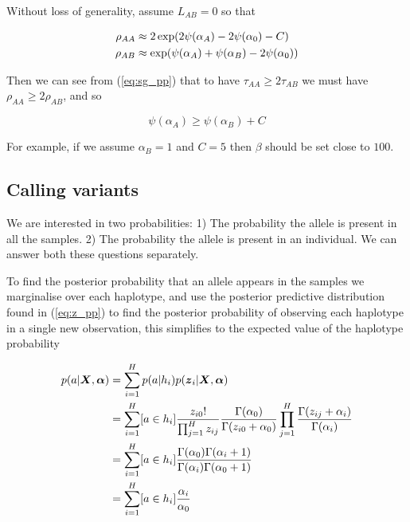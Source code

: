 \documentclass{article}
\begin{document}
Without loss of generality, assume $L_{AB} = 0$ so that

\begin{align}
\rho_{AA} &\approx 2 \exp(2 \psi(\alpha_A) - 2 \psi(\alpha_0) - C) \notag \\
\rho_{AB} &\approx \exp(\psi(\alpha_A) + \psi(\alpha_B) - 2 \psi(\alpha_0)) \notag
\end{align}

Then we can see from (\ref{eq:sg_pp}) that to have $\tau_{AA} \ge 2 \tau_{AB}$ we must have $\rho_{AA} \ge 2 \rho_{AB}$, and so

\begin{equation}
    \psi(\alpha_A) \ge \psi(\alpha_B) + C
\end{equation}

For example, if we assume $\alpha_B = 1$ and $C = 5$ then $\beta$ should be set close to $100$.

\subsection{Calling variants}

We are interested in two probabilities: 1) The probability the allele is present in all the samples. 2) The probability the allele is present in an individual. We can answer both these questions separately.

To find the posterior probability that an allele appears in the samples we marginalise over each haplotype, and use the posterior predictive distribution found in (\ref{eq:z_pp}) to find the posterior probability of observing each haplotype in a single new observation, this simplifies to the expected value of the haplotype probability

\begin{align}
    p(a | \boldsymbol{X}, \boldsymbol{\alpha}) &= \sum_{i = 1}^H p(a | h_i) p(\boldsymbol{z}_i | \boldsymbol{X}, \boldsymbol{\alpha}) \notag \\
    &= \sum_{i = 1}^H [a \in h_i] \frac{z_{i0}!}{\prod_{j = 1}^{H} z_{ij}} \frac{\Gamma(\alpha_0)}{\Gamma(z_{i0} + \alpha_0)} \prod_{j = 1}^H \frac{\Gamma(z_{ij} + \alpha_i)}{\Gamma(\alpha_i)} \notag \\
    &= \sum_{i = 1}^H [a \in h_i] \frac{\Gamma(\alpha_0)\Gamma(\alpha_i + 1)}{\Gamma(\alpha_i)\Gamma(\alpha_0 + 1)} \notag \\
    &= \sum_{i = 1}^H [a \in h_i] \frac{\alpha_i}{\alpha_0}
\end{align}
\end{document}
